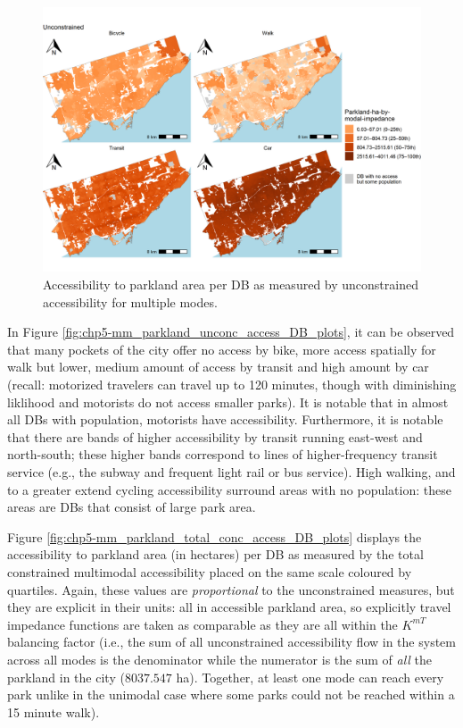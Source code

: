 \documentclass[
11pt, %
oneside, %
english, %
singlespacing, %
]{macthesis} %
\begin{document}
\begin{figure}

{\centering \includegraphics[width=6in]{./data/figures/chp5-mm_parkland_unconc_access_DB_plots} 

}

\caption{\label{fig:chp5-mm_parkland_unconc_access_DB_plots}Accessibility to parkland area per DB as measured by unconstrained accessibility for multiple modes.}\label{fig:unnamed-chunk-76}
\end{figure}

In Figure \ref{fig:chp5-mm_parkland_unconc_access_DB_plots}, it can be observed that many pockets of the city offer no access by bike, more access spatially for walk but lower, medium amount of access by transit and high amount by car (recall: motorized travelers can travel up to 120 minutes, though with diminishing liklihood and motorists do not access smaller parks). It is notable that in almost all DBs with population, motorists have accessibility. Furthermore, it is notable that there are bands of higher accessibility by transit running east-west and north-south; these higher bands correspond to lines of higher-frequency transit service (e.g., the subway and frequent light rail or bus service). High walking, and to a greater extend cycling accessibility surround areas with no population: these areas are DBs that consist of large park area.

Figure \ref{fig:chp5-mm_parkland_total_conc_access_DB_plots} displays the accessibility to parkland area (in hectares) per DB as measured by the total constrained multimodal accessibility placed on the same scale coloured by quartiles. Again, these values are \emph{proportional} to the unconstrained measures, but they are explicit in their units: all in accessible parkland area, so explicitly travel impedance functions are taken as comparable as they are all within the \(K^{mT}\) balancing factor (i.e., the sum of all unconstrained accessibility flow in the system across all modes is the denominator while the numerator is the sum of \emph{all} the parkland in the city (\(8037.547\) ha). Together, at least one mode can reach every park unlike in the unimodal case where some parks could not be reached within a 15 minute walk).
\end{document}
